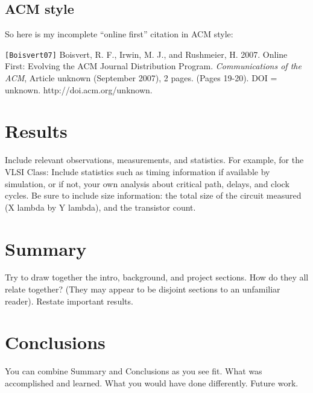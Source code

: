 \documentclass[final]{ieee}
\begin{document}
\subsection{ACM style}
So here is my
incomplete ``online first'' citation in ACM style:

\verb"[Boisvert07]" Boisvert, R. F., Irwin, M. J., and Rushmeier, H. 2007.
Online First: Evolving the ACM Journal Distribution Program.
{\it Communications of the ACM}, Article unknown (September 2007), 2 pages.
(Pages 19-20). DOI = unknown. http://doi.acm.org/unknown.






\section{Results}
            Include relevant observations, measurements, and statistics.
            For example, for the VLSI Class: Include statistics such as
            timing information if available by simulation, or if not,
            your own analysis about critical path, delays, and clock
            cycles. Be sure to include size information: the total size
            of the circuit measured (X lambda by Y lambda), and the
            transistor count. 
            
\section{Summary}
           Try to draw together the intro, background, and project
            sections.
           How do they all relate together? (They may appear to be
            disjoint sections to an unfamiliar reader).
           Restate important results.
\section{Conclusions}
           You can combine Summary and Conclusions as you see fit.
           What was accomplished and learned.
           What you would have done differently.
           Future work.
           
\end{document}
